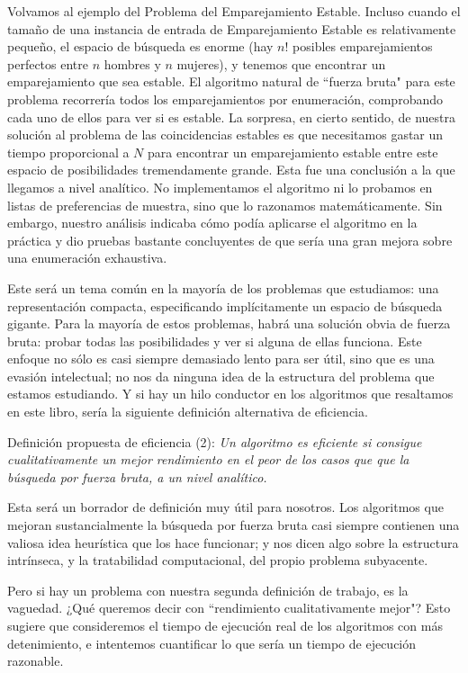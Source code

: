 \documentclass[a4paper, 12pt]{book}
\begin{document}
Volvamos al ejemplo del Problema del Emparejamiento Estable. Incluso cuando el tamaño de una instancia de entrada de Emparejamiento Estable es relativamente pequeño, el espacio de búsqueda es enorme (hay $n!$ posibles emparejamientos perfectos entre $n$ hombres y $n$ mujeres), y tenemos que encontrar un emparejamiento que sea estable. El algoritmo natural de ``fuerza bruta" para este problema recorrería todos los emparejamientos por enumeración, comprobando cada uno de ellos para ver si es estable. La sorpresa, en cierto sentido, de nuestra solución al problema de las coincidencias estables es que necesitamos gastar un tiempo proporcional a $N$ para encontrar un emparejamiento estable
entre este espacio de posibilidades tremendamente grande. Esta fue una conclusión a la que llegamos a nivel analítico. No implementamos el algoritmo ni lo probamos en listas de preferencias de muestra, sino que lo razonamos matemáticamente. Sin embargo, nuestro análisis indicaba cómo podía aplicarse el algoritmo en la práctica y dio pruebas bastante concluyentes de que sería una gran mejora sobre una enumeración exhaustiva.

Este será un tema común en la mayoría de los problemas que estudiamos: una representación compacta, especificando implícitamente un espacio de búsqueda gigante. Para la mayoría de estos problemas, habrá una solución obvia de fuerza bruta: probar todas las posibilidades y ver si alguna de ellas funciona. Este enfoque no sólo es casi siempre demasiado lento para ser útil, sino que es una evasión intelectual; no nos da ninguna idea de la estructura del problema que estamos estudiando. 
Y si hay un hilo conductor en los algoritmos que resaltamos en este libro, sería la siguiente definición alternativa de eficiencia.

\vspace{18pt}
Definición propuesta de eficiencia (2): \textit{Un algoritmo es eficiente si consigue cualitativamente un mejor rendimiento en el peor de los casos que que la búsqueda por fuerza bruta, a un nivel analítico.}
\vspace{18pt}

Esta será un borrador de definición muy útil para nosotros. Los algoritmos que mejoran sustancialmente la búsqueda por fuerza bruta casi siempre contienen una valiosa idea heurística que los hace funcionar; y nos dicen algo sobre la estructura intrínseca, y la tratabilidad computacional, del propio problema subyacente. 

Pero si hay un problema con nuestra segunda definición de trabajo, es la vaguedad.
¿Qué queremos decir con ``rendimiento cualitativamente mejor"? Esto sugiere que consideremos el tiempo de ejecución real de los algoritmos con más detenimiento, e intentemos cuantificar lo que sería un tiempo de ejecución razonable.
\end{document}
